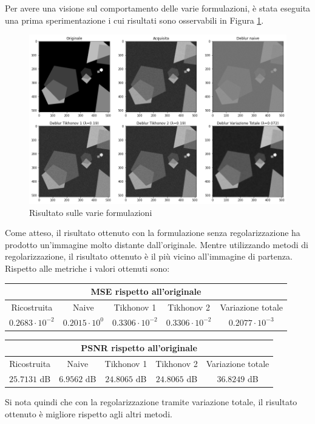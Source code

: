 \documentclass[11pt]{article}
\begin{document}
Per avere una visione sul comportamento delle varie formulazioni, è stata eseguita una prima sperimentazione i cui risultati sono osservabili in Figura \ref{fig:deblur1}.\\
\begin{figure}[H]
    \centering
    \includegraphics[width=15cm]{deblur1.png}
    \caption{Risultato sulle varie formulazioni}
    \label{fig:deblur1}
\end{figure}
Come atteso, il risultato ottenuto con la formulazione senza regolarizzazione ha prodotto un'immagine molto distante dall'originale. 
Mentre utilizzando metodi di regolarizzazione, il risultato ottenuto è il più vicino all'immagine di partenza. \\
Rispetto alle metriche i valori ottenuti sono:
\begin{center}
    \begin{tabular}{ |c|c|c|c|c| }
    \hline
    \multicolumn{5}{|c|}{MSE rispetto all'originale} \\
    \hline
    Ricostruita & Naive & Tikhonov 1 & Tikhonov 2 & Variazione totale \\ 
    $0.2683 \cdot 10^{-2}$ & $0.2015 \cdot 10^{0}$ & $0.3306 \cdot 10^{-2}$ & $0.3306 \cdot 10^{-2}$ & $0.2077 \cdot 10^{-3}$ \\ 
    \hline
    \end{tabular}
\end{center}
\begin{center}
    \begin{tabular}{ |c|c|c|c|c| }
    \hline
    \multicolumn{5}{|c|}{PSNR rispetto all'originale} \\
    \hline
    Ricostruita & Naive & Tikhonov 1 & Tikhonov 2 & Variazione totale \\ 
    $25.7131$ dB & $6.9562$ dB & $24.8065$ dB & $24.8065$ dB & $36.8249$ dB \\ 
    \hline
    \end{tabular}
\end{center}
Si nota quindi che con la regolarizzazione tramite variazione totale, il risultato ottenuto è migliore rispetto agli altri metodi.
\end{document}

